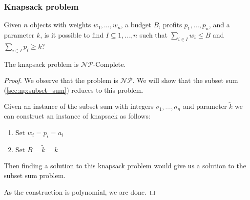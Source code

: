 \documentclass[12pt]{extarticle}
\newcommand{\NP}{{\mathcal{NP}}}
\newcommand{\NPC}{$\NP$-Complete}
\begin{document}
\subsubsection{Knapsack problem}

\begin{definition}
    Given $n$ objects with weights $w_1, \ldots, w_n$, a budget $B$, profits $p_1, \ldots, p_n$, and a parameter $k$, is it possible to find $I \subseteq {1, \ldots, n}$ such that $\sum_{i \in I} w_i \leq B$ and $\sum_{i \in I} p_i \geq k$?
\end{definition}
\begin{theorem}
    The knapsack problem is \NPC.
\end{theorem}

\begin{proof}
    We observe that the problem is $\NP$.
    We will show that the subset sum (\autoref{sec:np:subset_sum}) reduces to this problem.

    Given an instance of the subset sum with integers $a_1, \ldots, a_n$ and parameter $\tilde{k}$ we can construct an instance of knapsack as follows:
    \begin{enumerate}
        \item Set $w_i = p_i = a_i$
        \item Set $B = \tilde{k} = k$
    \end{enumerate}

    Then finding a solution to this knapsack problem would give us a solution to the subset sum problem.

    As the construction is polynomial, we are done.
\end{proof}
\end{document}
